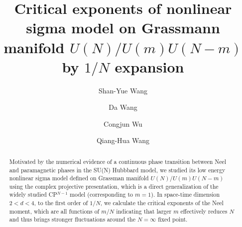 \documentclass[aps,twocolumn,superscriptaddress]{revtex4-1}
\begin{document}
\title{Critical exponents of nonlinear sigma model on Grassmann manifold $U(N)/U(m)U(N-m)$ by $1/N$ expansion}
\author{Shan-Yue Wang}
\author{Da Wang}
\author{Congjun Wu}
\author{Qiang-Hua Wang}
\begin{abstract}
  Motivated by the numerical evidence of a continuous phase transition between Neel and paramagnetic phases in the SU(N) Hubbbard model, we studied its low energy nonlinear sigma model defined on Grassman manifold $U(N)/U(m)U(N-m)$ using the complex projective presentation, which is a direct generalization of the widely studied CP$^{N-1}$ model (corresponding to $m=1$). In space-time dimension $2<d<4$, to the first order of $1/N$, we calculate the critical exponents of the Neel moment, which are all functions of $m/N$ indicating that larger $m$ effectively reduces $N$ and thus brings stronger fluctuations around the $N=\infty$ fixed point. 
\end{abstract}
\maketitle
\end{document}
